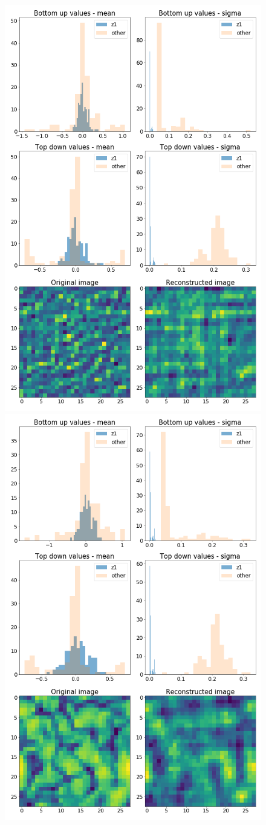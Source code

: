 \documentclass[12pt, english]{article}
\begin{document}
\begin{figure}[H]
  \begin{minipage}[b]{0.5\linewidth}
    \centering
    \includegraphics[width=.6\linewidth]{z1_vis/z1_vis_no_contrast_norm/17_DenseLinLinLadderVAE_contrastNorm-stats-1_TD_BU_COMPS_1.png}
  \end{minipage}
  \begin{minipage}[b]{0.5\linewidth}
    \centering
    \includegraphics[width=.6\linewidth]{z1_vis/z1_vis_no_contrast_norm/17_DenseLinLinLadderVAE_contrastNorm-stats-2_TD_BU_COMPS_1.png} 
  \end{minipage}


\end{figure}
\end{document}
